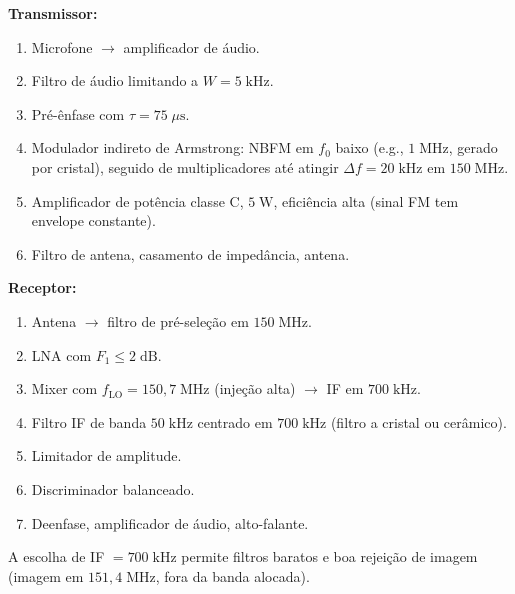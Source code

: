 \documentclass[11pt,a4paper]{article}
\begin{document}
\begin{resolucao}

\textbf{Transmissor:}
\begin{enumerate}\itemsep0pt
  \item Microfone $\to$ amplificador de áudio.
  \item Filtro de áudio limitando a $W = 5\;\text{kHz}$.
  \item Pré-ênfase com $\tau = 75\;\mu\text{s}$.
  \item Modulador indireto de Armstrong: NBFM em $f_0$ baixo (e.g., $1\;\text{MHz}$, gerado por cristal), seguido de multiplicadores até atingir $\Delta f = 20\;\text{kHz}$ em $150\;\text{MHz}$.
  \item Amplificador de potência classe C, $5\;\text{W}$, eficiência alta (sinal FM tem envelope constante).
  \item Filtro de antena, casamento de impedância, antena.
\end{enumerate}

\textbf{Receptor:}
\begin{enumerate}\itemsep0pt
  \item Antena $\to$ filtro de pré-seleção em $150\;\text{MHz}$.
  \item LNA com $F_1 \le 2\;\text{dB}$.
  \item Mixer com $f_{\text{LO}} = 150{,}7\;\text{MHz}$ (injeção alta) $\to$ IF em $700\;\text{kHz}$.
  \item Filtro IF de banda $50\;\text{kHz}$ centrado em $700\;\text{kHz}$ (filtro a cristal ou cerâmico).
  \item Limitador de amplitude.
  \item Discriminador balanceado.
  \item Deenfase, amplificador de áudio, alto-falante.
\end{enumerate}

A escolha de IF $= 700\;\text{kHz}$ permite filtros baratos e boa rejeição de imagem (imagem em $151{,}4\;\text{MHz}$, fora da banda alocada).
\end{resolucao}
\end{document}
